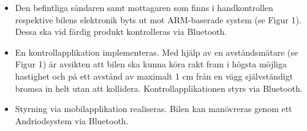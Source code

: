 \documentclass[a4paper]{article}
\begin{document}
\begin{itemize}
\item Den befintliga sändaren samt mottagaren som finns i handkontrollen respektive bilens elektronik byts ut mot ARM-baserade system (se Figur 1). Dessa ska vid färdig produkt kontrolleras via Bluetooth.
\item En kontrollapplikation implementeras. Med hjälp av en avståndsmätare (se Figur 1) är avsikten att bilen ska kunna köra rakt fram i högsta möjliga hastighet och på ett avstånd av maximalt 1 cm från en vägg självständigt bromsa in helt utan att kollidera. Kontrollapplikationen styrs via Bluetooth.
\item Styrning via mobilapplikation realiseras. Bilen kan manövreras genom ett Andriodsystem via Bluetooth.
\end{itemize}
\end{document}
